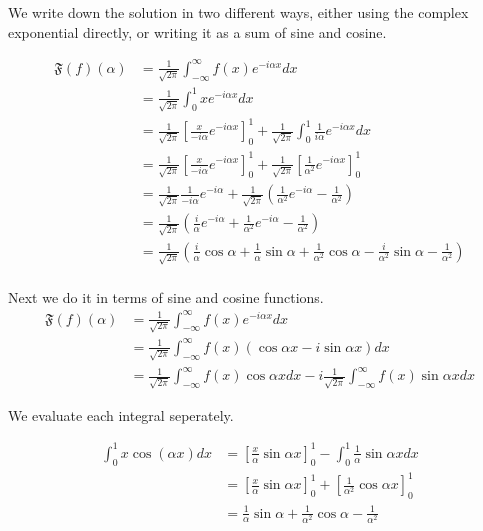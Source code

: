 \documentclass[11pt]{article}
\begin{document}
\begin{solution}     
    We write down the solution in two different ways, either using the complex exponential directly, or writing it as a sum of sine and cosine.

\begin{align*}
\mathfrak{F}(f)(\alpha)&=\frac{1}{\sqrt{2 \pi}} \int_{-\infty}^{\infty} f(x) e^{-i \alpha x} d x\\
&=\frac{1}{\sqrt{2 \pi}} \int_{0}^{1} x e^{-i \alpha x} d x\\
&=\frac{1}{\sqrt{2 \pi}} \left[ \frac{x}{-i\alpha} e^{-i \alpha x} \right]_0^1 + \frac{1}{\sqrt{2 \pi}} \int_{0}^{1} \frac{1}{i\alpha} e^{-i \alpha x} d x\\
&=\frac{1}{\sqrt{2 \pi}} \left[ \frac{x}{-i\alpha} e^{-i \alpha x} \right]_0^1 + \frac{1}{\sqrt{2 \pi}} \left[ \frac{1}{\alpha^2} e^{-
i \alpha x} \right]_{0}^1\\
&=\frac{1}{\sqrt{2 \pi}} \frac{1}{-i\alpha} e^{-i \alpha } + \frac{1}{\sqrt{2 \pi}} \left( \frac{1}{\alpha^2} e^{-i \alpha} -\frac{1}{\alpha^2}\right)\\
&=\frac{1}{\sqrt{2 \pi}}\left( \frac{i}{\alpha} e^{-i \alpha } + \frac{1}{\alpha^2} e^{-i \alpha} -\frac{1}{\alpha^2}\right)\\ 
&=\frac{1}{\sqrt{2 \pi}}\left( \frac{i}{\alpha} \cos\alpha  + \frac{1}{\alpha} \sin\alpha + \frac{1}{\alpha^2} \cos\alpha - \frac{i}{\alpha^2} \sin\alpha -\frac{1}{\alpha^2}\right)\\ 
\end{align*}

Next we do it in terms of sine and cosine functions.
$$
\begin{aligned}
\mathfrak{F}(f)(\alpha)&=\frac{1}{\sqrt{2 \pi}} \int_{-\infty}^{\infty} f(x) e^{-i \alpha x} d x\\
&=\frac{1}{\sqrt{2 \pi}} \int_{-\infty}^{\infty} f(x)(\cos \alpha x - i\sin\alpha x) d x\\
& = \frac{1}{\sqrt{2 \pi}} \int_{-\infty}^{\infty} f(x) \cos\alpha x d x - i\frac{1}{\sqrt{2 \pi}} \int_{-\infty}^{\infty} f(x) \sin\alpha x d x
\end{aligned}
$$

We evaluate each integral seperately.

$$\begin{aligned} \int_0^1 x \cos (\alpha x) d x & =\left[\frac{x}{\alpha} \sin \alpha x\right]_0^1-\int_0^1 \frac{1}{\alpha} \sin \alpha x d x \\ & =\left[\frac{x}{\alpha} \sin \alpha x\right]_0^1+\left[\frac{1}{\alpha^2} \cos \alpha x\right]_0^1 \\ & =\frac{1}{\alpha} \sin \alpha+\frac{1}{\alpha^2} \cos \alpha-\frac{1}{\alpha^2}\end{aligned}$$


\end{solution}
\end{document}
